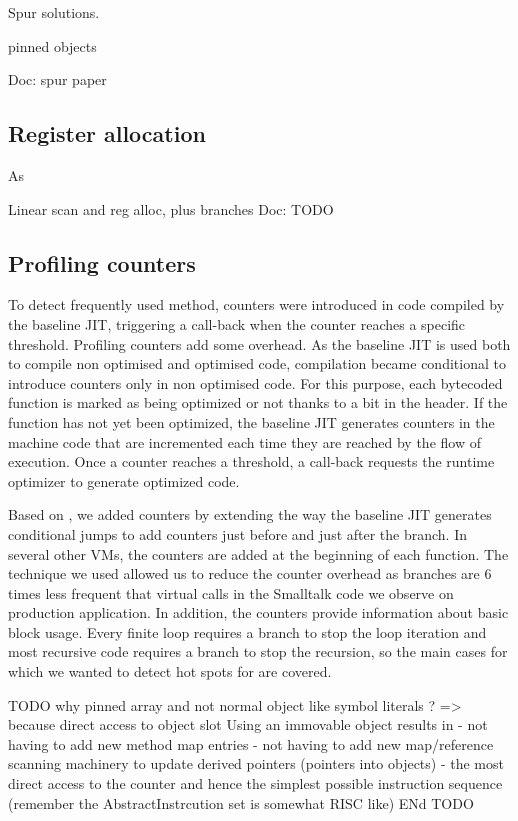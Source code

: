 \documentclass[a4paper,12pt,twoside]{../includes/ThesisStyle}
\begin{document}
Spur solutions.

pinned objects

Doc: spur paper

\subsection{Register allocation}

As

Linear scan and reg alloc, plus branches
Doc: TODO

\subsection{Profiling counters}

To detect frequently used method, counters were introduced in code compiled by the baseline JIT, triggering a call-back when the counter reaches a specific threshold. Profiling counters add some overhead. As the baseline JIT is used both to compile non optimised and optimised code, compilation became conditional to introduce counters only in non optimised code. For this purpose, each bytecoded function is marked as being optimized or not thanks to a bit in the header. If the function has not yet been optimized, the baseline JIT generates counters in the machine code that are incremented each time they are reached by the flow of execution. Once a counter reaches a threshold, a call-back requests the runtime optimizer to generate optimized code.

Based on \cite{Arn02}, we added counters by extending the way the baseline JIT generates conditional jumps to add counters just before and just after the branch. In several other VMs, the counters are added at the beginning of each function. The technique we used allowed us to reduce the counter overhead as branches are 6 times less frequent that virtual calls in the Smalltalk code we observe on production application. In addition, the counters provide information about basic block usage. Every finite loop requires a branch to stop the loop iteration and most recursive code requires a branch to stop the recursion, so the main cases for which we wanted to detect hot spots for are covered.

TODO why pinned array and not normal object like symbol literals ? => because direct access to object slot 
Using an immovable object results in 
- not having to add new method map entries
- not having to add new map/reference scanning machinery to update derived pointers (pointers into objects)
- the most direct access to the counter and hence the simplest possible instruction sequence (remember the AbstractInstrcution set is somewhat RISC like)
ENd TODO
\end{document}
